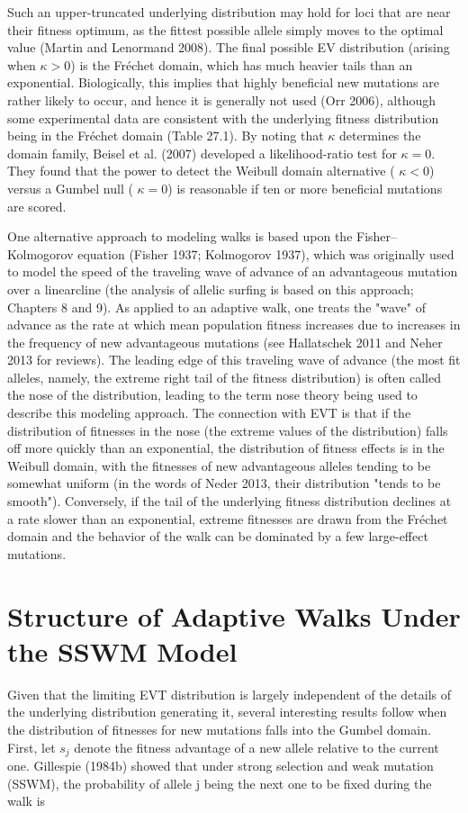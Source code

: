 \documentclass{article}
\begin{document}
Such an upper-truncated underlying distribution may hold for loci that are near their fitness optimum, as the fittest possible allele simply moves to the optimal value (Martin and Lenormand 2008). The final possible EV distribution (arising when  $ \kappa > 0 $) is the Fréchet domain, which has much heavier tails than an exponential. Biologically, this implies that highly beneficial new mutations are rather likely to occur, and hence it is generally not used (Orr 2006), although some experimental data are consistent with the underlying fitness distribution being in the Fréchet domain (Table 27.1). By noting that  $ \kappa $ determines the domain family, Beisel et al. (2007) developed a likelihood-ratio test for  $ \kappa = 0 $. They found that the power to detect the Weibull domain alternative ( $ \kappa < 0 $) versus a Gumbel null ( $ \kappa = 0 $) is reasonable if ten or more beneficial mutations are scored.

One alternative approach to modeling walks is based upon the Fisher–Kolmogorov equation (Fisher 1937; Kolmogorov 1937), which was originally used to model the speed of the traveling wave of advance of an advantageous mutation over a linearcline (the analysis of allelic surfing is based on this approach; Chapters 8 and 9). As applied to an adaptive walk, one treats the "wave" of advance as the rate at which mean population fitness increases due to increases in the frequency of new advantageous mutations (see Hallatschek 2011 and Neher 2013 for reviews). The leading edge of this traveling wave of advance (the most fit alleles, namely, the extreme right tail of the fitness distribution) is often called the nose of the distribution, leading to the term nose theory being used to describe this modeling approach. The connection with EVT is that if the distribution of fitnesses in the nose (the extreme values of the distribution) falls off more quickly than an exponential, the distribution of fitness effects is in the Weibull domain, with the fitnesses of new advantageous alleles tending to be somewhat uniform (in the words of Neder 2013, their distribution "tends to be smooth"). Conversely, if the tail of the underlying fitness distribution declines at a rate slower than an exponential, extreme fitnesses are drawn from the Fréchet domain and the behavior of the walk can be dominated by a few large-effect mutations.

\section{Structure of Adaptive Walks Under the SSWM Model}
Given that the limiting EVT distribution is largely independent of the details of the underlying distribution generating it, several interesting results follow when the distribution of fitnesses for new mutations falls into the Gumbel domain. First, let  $ s_{j} $ denote the fitness advantage of a new allele relative to the current one. Gillespie (1984b) showed that under strong selection and weak mutation (SSWM), the probability of allele j being the next one to be fixed during the walk is
\end{document}
